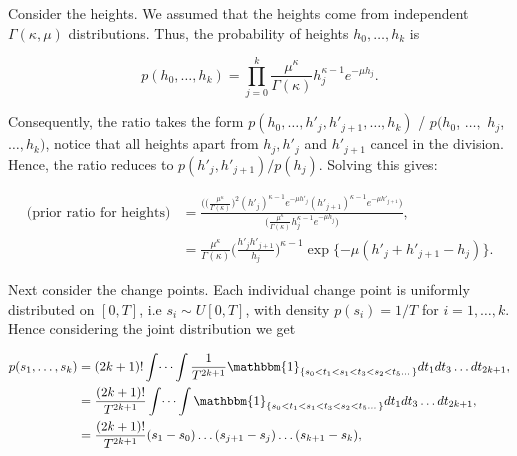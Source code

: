 \documentclass[../main.tex]{subfiles}
\begin{document}
Consider the heights. We assumed that the heights come from independent $\Gamma (\kappa, \mu)$ distributions. Thus, the probability of heights $h_0, \dots, h_k$ is

\begin{equation}
p(h_0, \dots, h_k) = \prod^k_{j=0} \frac{\mu^\kappa}{\Gamma (\kappa)} h_j^{\kappa-1}e^{-\mu h_j}. 
\end{equation}

Consequently, the ratio takes the form $ p(h_0, \dots, h'_j,h'_{j+1} , \dots, h_k)$ / $ p(h_0$, $\dots,$ $h_j $, $\dots, h_k) $, notice that all heights apart from $h_j, h'_j$ and $h'_{j+1}$ cancel in the division. Hence, the ratio reduces to $p(h'_j , h'_{j+1}) / p(h_j)$. Solving this gives:

\begin{align}
\text{(prior ratio for heights)} & =  \frac{\bigg( \big( \frac{\mu^\kappa}{\Gamma (\kappa)} \big)^2 (h'_j)^{\kappa-1} e^{-\mu h'_j} (h'_{j+1})^{\kappa-1}e^{-\mu h'_{j+1}} \bigg)}
{\bigg(\frac{\mu^\kappa}{\Gamma (\kappa)} h_j^{\kappa-1} e^{-\mu h_j}   \bigg)}, \\
& =  \frac{\mu^\kappa}{\Gamma (\kappa)} \bigg(\frac{h'_j h'_{j+1}}{h_j}\bigg)^{\kappa-1} \exp \{- \mu (h'_j + h'_{j+1} - h_j) \}.  \label{eq:ratioH}
\end{align}

Next consider the change points. Each individual change point is uniformly distributed on $[0,T]$, i.e $s_i \sim U[0,T]$, with density $p(s_i) = 1/T$ for $i = 1, \dots, k$. Hence considering the joint distribution we get


\begin{align}
p(s_1, \dots, s_k) &= (2k+1)!\int \dots \int \frac{1}{T^{2k+1}} \mathbbm{1}_{ \left\{ s_0 < t_1 <s_1 < t_3 < s_2 < t_5 \dots \right\}} dt_1 dt_3 \dots dt_{2k+1}, \\
&= \frac{(2k+1)!}{T^{2k+1}}\int \dots \int \mathbbm{1}_{ \left\{ s_0 < t_1 <s_1 < t_3 < s_2 < t_5 \dots \right\} } dt_1dt_3 \dots dt_{2k+1},  \\
&= \frac{(2k+1)!}{T^{2k+1}} (s_1-s_0) \dots (s_{j+1}-s_j) \dots (s_{k+1}-s_{k}),\label{eq:cp}
\end{align}
\end{document}
